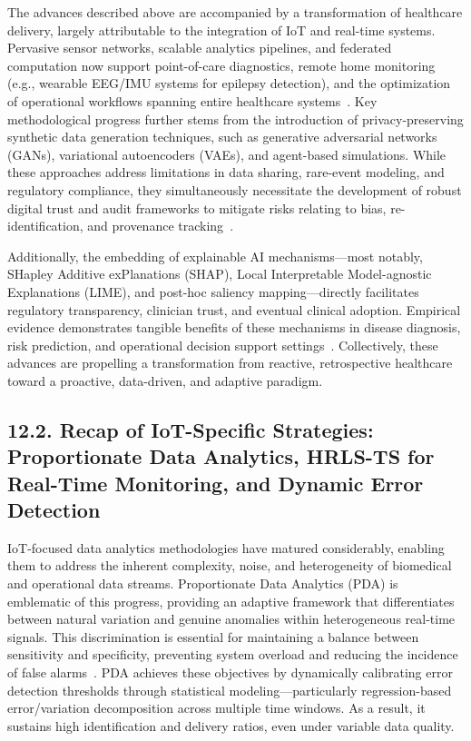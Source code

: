 \documentclass[11pt]{article}
\begin{document}
The advances described above are accompanied by a transformation of healthcare delivery, largely attributable to the integration of IoT and real-time systems. Pervasive sensor networks, scalable analytics pipelines, and federated computation now support point-of-care diagnostics, remote home monitoring (e.g., wearable EEG/IMU systems for epilepsy detection), and the optimization of operational workflows spanning entire healthcare systems~\cite{ref24, ref27, ref106, ref107}. Key methodological progress further stems from the introduction of privacy-preserving synthetic data generation techniques, such as generative adversarial networks (GANs), variational autoencoders (VAEs), and agent-based simulations. While these approaches address limitations in data sharing, rare-event modeling, and regulatory compliance, they simultaneously necessitate the development of robust digital trust and audit frameworks to mitigate risks relating to bias, re-identification, and provenance tracking~\cite{ref51, ref94, ref95}.

Additionally, the embedding of explainable AI mechanisms—most notably, SHapley Additive exPlanations (SHAP), Local Interpretable Model-agnostic Explanations (LIME), and post-hoc saliency mapping—directly facilitates regulatory transparency, clinician trust, and eventual clinical adoption. Empirical evidence demonstrates tangible benefits of these mechanisms in disease diagnosis, risk prediction, and operational decision support settings~\cite{ref34, ref51, ref76, ref87, ref91}. Collectively, these advances are propelling a transformation from reactive, retrospective healthcare toward a proactive, data-driven, and adaptive paradigm.

\subsection{12.2. Recap of IoT-Specific Strategies: Proportionate Data Analytics, HRLS-TS for Real-Time Monitoring, and Dynamic Error Detection}

IoT-focused data analytics methodologies have matured considerably, enabling them to address the inherent complexity, noise, and heterogeneity of biomedical and operational data streams. Proportionate Data Analytics (PDA) is emblematic of this progress, providing an adaptive framework that differentiates between natural variation and genuine anomalies within heterogeneous real-time signals. This discrimination is essential for maintaining a balance between sensitivity and specificity, preventing system overload and reducing the incidence of false alarms~\cite{ref106}. PDA achieves these objectives by dynamically calibrating error detection thresholds through statistical modeling—particularly regression-based error/variation decomposition across multiple time windows. As a result, it sustains high identification and delivery ratios, even under variable data quality.
\end{document}
